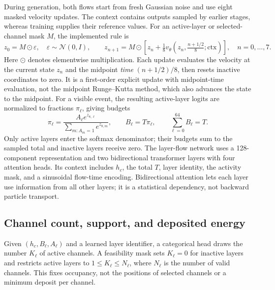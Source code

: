 \documentclass[11pt]{article}
\begin{document}
During generation, both flows start from fresh Gaussian noise and use eight masked velocity updates. The context contains outputs sampled by earlier stages, whereas training supplies their reference values. For an active-layer or selected-channel mask $M$, the implemented rule is
\begin{equation}
 z_0=M\odot\varepsilon,\quad \varepsilon\sim\mathcal N(0,I),\qquad
 z_{n+1}=M\odot\left[z_n+\tfrac18
 v_\theta\!\left(z_n,\tfrac{n+1/2}{8};\mathrm{ctx}\right)\right],
 \quad n=0,\ldots,7.
 \label{eq:flow_steps}
\end{equation}
Here $\odot$ denotes elementwise multiplication. Each update evaluates the velocity at the current state $z_n$ and the midpoint \emph{time} $(n+1/2)/8$, then resets inactive coordinates to zero. It is a first-order explicit update with midpoint-time evaluation, not the midpoint Runge--Kutta method, which also advances the state to the midpoint. For a visible event, the resulting active-layer logits are normalized to fractions $\pi_\ell$, giving budgets
\begin{equation}
 \pi_\ell=\frac{A_\ell e^{z_{8,\ell}}}
 {\sum_{m:A_m=1}e^{z_{8,m}}},\qquad
 B_\ell=T\pi_\ell,\qquad \sum_{\ell=0}^{64}B_\ell=T.
 \label{eq:layer_budget}
\end{equation}
Only active layers enter the softmax denominator; their budgets sum to the sampled total and inactive layers receive zero. The layer-flow network uses a 128-component representation and two bidirectional transformer layers with four attention heads. Its context includes $h_c$, the total $T$, layer identity, the activity mask, and a sinusoidal flow-time encoding. Bidirectional attention lets each layer use information from all other layers; it is a statistical dependency, not backward particle transport.

\subsection{Channel count, support, and deposited energy}

Given $(h_c,B_\ell,A_\ell)$ and a learned layer identifier, a categorical head draws the number $K_\ell$ of active channels. A feasibility mask sets $K_\ell=0$ for inactive layers and restricts active layers to $1\leq K_\ell\leq N_\ell$, where $N_\ell$ is the number of valid channels. This fixes occupancy, not the positions of selected channels or a minimum deposit per channel.
\end{document}
